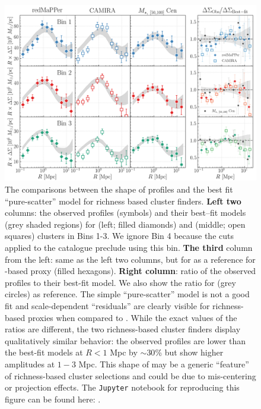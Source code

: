 \documentclass[fleqn,usenatbib,useAMS]{mnras}
\begin{document}
\begin{CJK*}{UTF8}{gbsn}
\begin{figure}
    \centering
    \includegraphics[width=\textwidth]{figure/fig_10}
    \caption{
        The comparisons between the shape of \rdsigma{} profiles and the best fit ``pure-scatter''
        model for richness based cluster finders. 
        \textbf{Left two} columns: the observed \rdsigma{} profiles (symbols) and their
        best--fit models (grey shaded regions) for \redm{} (left; filled diamonds) and \camira{}
        (middle; open squares) clusters in Bins 1-3. 
        We ignore Bin 4 because the cuts applied to the \camira{} catalogue preclude using this bin. 
        \textbf{The third} column from the left: same as the left two columns, but for 
         as a reference for \mstar{}-based \mvir{} proxy (filled hexagons).
        \textbf{Right column}: ratio of the observed \dsigma{} profiles to their best-fit model.
        We also show the ratio for  (grey circles) as reference.
        The simple ``pure-scatter'' model is not a good fit and scale-dependent ``residuals'' are
        clearly visible for richness-based \mvir{} proxies when compared to .
        While the exact values of the ratios are different, the two richness-based cluster finders
        display qualitatively similar behavior: the observed \dsigma{} profiles are lower than the
        best-fit models at $R<1$ Mpc by $\sim 30$\% but show higher amplitudes at $1-3$ Mpc. 
        This shape of \rdsigma{} may be a generic ``feature'' of richness-based cluster selections
        and could be due to mis-centering or projection effects.
        The \texttt{Jupyter} notebook for reproducing this figure can be found here:
        \href{https://github.com/dr-guangtou/jianbing/blob/master/notebooks/figure/fig10.ipynb}{\faGithub}.
    }
    \label{fig:richness_residual}
\end{figure}


\end{CJK*}
\end{document}
